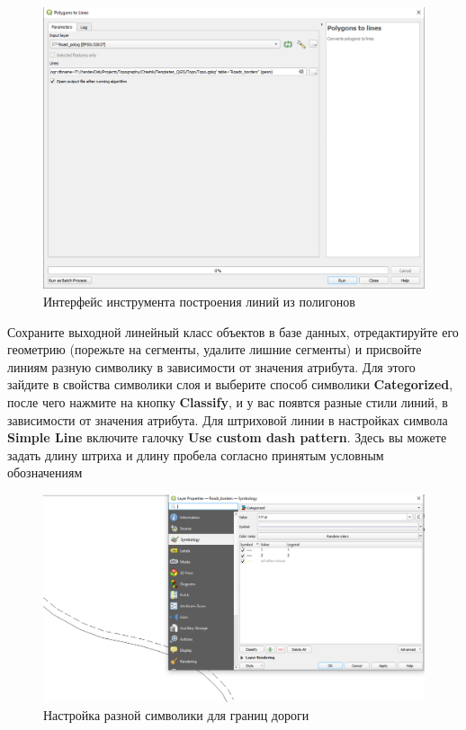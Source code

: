 \documentclass[
  12pt,
]{book}
\begin{document}
\begin{figure}
\centering
\includegraphics{images/Practice/Polygons_to_Lines.png}
\caption{Интерфейс инструмента построения линий из полигонов}
\end{figure}

Сохраните выходной линейный класс объектов в базе данных, отредактируйте его геометрию (порежьте на сегменты, удалите лишние сегменты) и присвойте линиям разную символику в зависимости от значения атрибута. Для этого зайдите в свойства символики слоя и выберите способ символики \textbf{Categorized}, после чего нажмите на кнопку \textbf{Classify}, и у вас появтся разные стили линий, в зависимости от значения атрибута. Для штриховой линии в настройках символа \textbf{Simple Line} включите галочку \textbf{Use custom dash pattern}. Здесь вы можете задать длину штриха и длину пробела согласно принятым условным обозначениям

\begin{figure}
\centering
\includegraphics{images/Practice/Roads_borders.png}
\caption{Настройка разной символики для границ дороги}
\end{figure}
\end{document}
